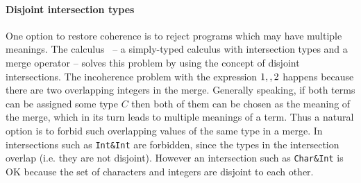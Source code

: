 \paragraph{Disjoint intersection types}
One option to restore coherence is to reject programs which may have
multiple meanings.  The \oldname calculus~\cite{oliveira16disjoint} --
a simply-typed calculus with intersection types and a merge operator
-- solves this problem by using the concept of disjoint intersections.
The incoherence problem with the expression $1 ,, 2$
happens because there are two overlapping integers in the merge. 
Generally speaking, if both terms can be assigned some type $C$
then both of them can be chosen as the meaning of the merge,
which in its turn leads to multiple meanings of a term.
Thus a natural option is to forbid such overlapping
values of the same type in a merge. In \oldname 
intersections such as \lstinline{Int&Int} are forbidden, since 
the types in the intersection overlap (i.e. they are not disjoint). However an intersection 
such as \lstinline{Char&Int} is OK because the set of characters 
and integers are disjoint to each other. 

\begin{comment}
This is precisely the approach taken in \oldname: a merge can only be composed of
two values as long as their types are \emph{disjoint}.  
Disjointness is a binary relation between two types, defined for any types which
do not contain any overlapping types. For example \lstinline{Int&Char}
is disjoint to \lstinline{Bool} because  but \lstinline{
\end{comment}


